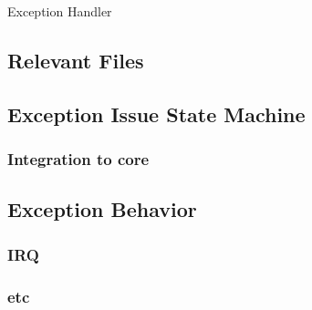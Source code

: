 Exception Handler

\subsection{Relevant Files}

\subsection{Exception Issue State Machine}

\subsubsection{Integration to core}

\subsection{Exception Behavior}

\subsubsection{IRQ}

\subsubsection{etc}